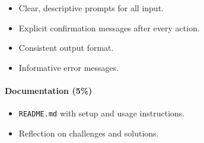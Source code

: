 \documentclass[
  justified,
  openright,
]{tufte-book}
\let\subsection\paragraph
\let\paragraph\paragraph
\let\subsection\paragraph
\let\paragraph\paragraph
\providecommand{\tightlist}{%
  \setlength{\itemsep}{0pt}\setlength{\parskip}{0pt}}
\begin{document}
\begin{itemize}
\tightlist
\item[$\square$]
  Clear, descriptive prompts for all input.
\item[$\square$]
  Explicit confirmation messages after every action.
\item[$\square$]
  Consistent output format.
\item[$\square$]
  Informative error messages.
\end{itemize}

\subsection{Documentation (5\%)}\label{documentation-5}

\begin{itemize}
\tightlist
\item[$\square$]
  \texttt{README.md} with setup and usage instructions.
\item[$\square$]
  Reflection on challenges and solutions.
\end{itemize}
\end{document}
